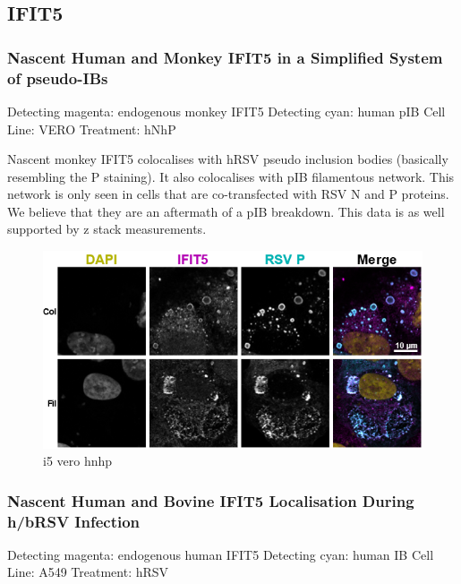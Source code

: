 \subsection{IFIT5} \label{subsec:IFIT5}
\subsubsection{Nascent Human and Monkey IFIT5 in a Simplified System of pseudo-IBs} \label{Nascent Human and Monkey IFIT5 in a Simplified System of pseudo-IBs}
Detecting magenta: endogenous monkey IFIT5 \newline
Detecting cyan: human pIB \newline
Cell Line: VERO \newline
Treatment: hNhP \newline

Nascent monkey IFIT5 colocalises with hRSV pseudo inclusion bodies (basically resembling the P staining). It also colocalises with pIB filamentous network. This network is only seen in cells that are co-transfected with RSV N and P proteins. We believe that they are an aftermath of a pIB breakdown. This data is as well supported by z stack measurements.

\begin{figure}
    \centering
    \includegraphics[width=1\linewidth]{09. Chapter 4/Figs/05. IFIT5/01. vero hnhp.png}
    \caption[i5 vero hnhp]{i5 vero hnhp}
    \label{fig:i5 vero hnhp}
\end{figure}

\subsubsection{Nascent Human and Bovine IFIT5 Localisation During h/bRSV Infection} \label{Nascent Human and Bovine IFIT5 Localisation During h/bRSV Infection}
 \label{hIFIT5 Localisation During hRSV Infection}
Detecting magenta: endogenous human IFIT5 \newline
Detecting cyan: human IB \newline
Cell Line: A549 \newline
Treatment: hRSV \newline

